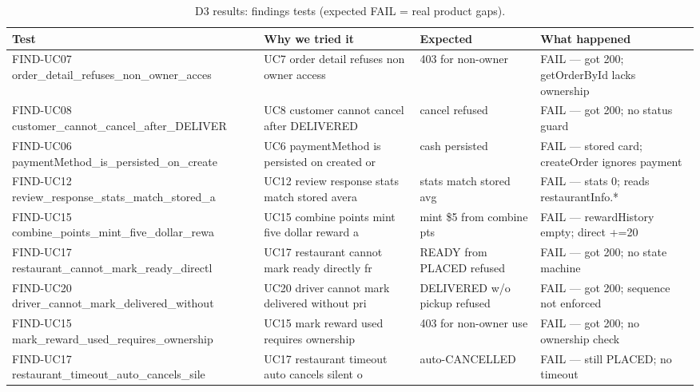 \begin{table}[t]
\caption{D3 results: findings tests (expected FAIL = real product gaps).}
\label{tab:d3f}
\centering\scriptsize
\begin{tabular}{p{3.8cm}p{3.6cm}p{2.8cm}p{2.6cm}}
\toprule
Test & Why we tried it & Expected & What happened \\
\midrule
FIND-UC07 order\_detail\_refuses\_non\_owner\_acces & UC7 order detail refuses non owner access & 403 for non-owner & FAIL --- got 200; getOrderById lacks ownership \\
FIND-UC08 customer\_cannot\_cancel\_after\_DELIVER & UC8 customer cannot cancel after DELIVERED & cancel refused & FAIL --- got 200; no status guard \\
FIND-UC06 paymentMethod\_is\_persisted\_on\_create & UC6 paymentMethod is persisted on created or & cash persisted & FAIL --- stored card; createOrder ignores payment \\
FIND-UC12 review\_response\_stats\_match\_stored\_a & UC12 review response stats match stored avera & stats match stored avg & FAIL --- stats 0; reads restaurantInfo.* \\
FIND-UC15 combine\_points\_mint\_five\_dollar\_rewa & UC15 combine points mint five dollar reward a & mint \$5 from combine pts & FAIL --- rewardHistory empty; direct +=20 \\
FIND-UC17 restaurant\_cannot\_mark\_ready\_directl & UC17 restaurant cannot mark ready directly fr & READY from PLACED refused & FAIL --- got 200; no state machine \\
FIND-UC20 driver\_cannot\_mark\_delivered\_without & UC20 driver cannot mark delivered without pri & DELIVERED w/o pickup refused & FAIL --- got 200; sequence not enforced \\
FIND-UC15 mark\_reward\_used\_requires\_ownership & UC15 mark reward used requires ownership & 403 for non-owner use & FAIL --- got 200; no ownership check \\
FIND-UC17 restaurant\_timeout\_auto\_cancels\_sile & UC17 restaurant timeout auto cancels silent o & auto-CANCELLED & FAIL --- still PLACED; no timeout \\
\bottomrule
\end{tabular}
\end{table}


